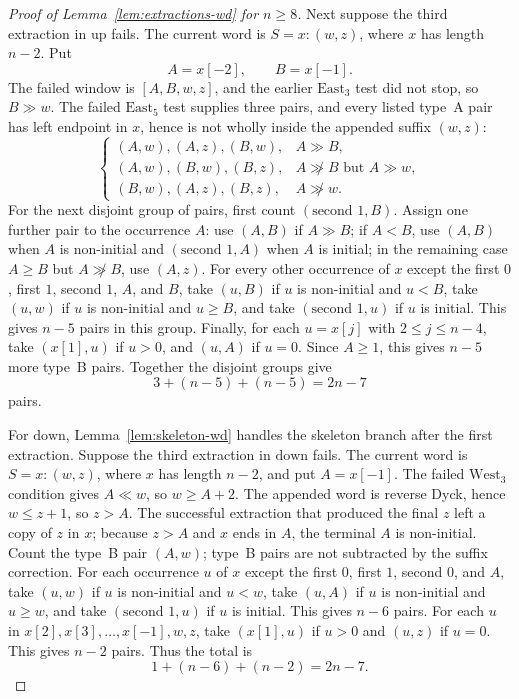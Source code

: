 \documentclass[11pt]{article}
\theoremstyle{plain}
\theoremstyle{definition}
\theoremstyle{remark}
\begin{document}
\begin{proof}[Proof of Lemma~\ref{lem:extractions-wd} for \(n\ge 8\)]
Next suppose the third extraction in \(\mathrm{up}\) fails.  The current word
is \(S=x:(w,z)\), where \(x\) has length \(n-2\).  Put
\[
  A=x[-2],\qquad B=x[-1].
\]
The failed window is \([A,B,w,z]\), and the earlier \(\mathrm{East}_3\) test
did not stop, so \(B\gg w\).  The failed \(\mathrm{East}_5\) test supplies
three pairs, and every listed type~A pair has left endpoint in \(x\), hence is
not wholly inside the appended suffix \((w,z)\):
\[
\begin{cases}
(A,w),(A,z),(B,w),& A\gg B,\\
(A,w),(B,w),(B,z),& A\not\gg B\text{ but }A\gg w,\\
(B,w),(A,z),(B,z),& A\not\gg w.
\end{cases}
\]
For the next disjoint group of pairs, first count
\((\text{second }1,B)\).  Assign one further pair to the occurrence \(A\):
use \((A,B)\) if \(A\gg B\); if \(A<B\), use \((A,B)\) when \(A\) is
non-initial and \((\text{second }1,A)\) when \(A\) is initial; in the remaining
case \(A\ge B\) but \(A\not\gg B\), use \((A,z)\).  For every other occurrence
of \(x\) except the first \(0\), first \(1\), second \(1\), \(A\), and \(B\),
take \((u,B)\) if \(u\) is non-initial and \(u<B\), take \((u,w)\) if \(u\) is
non-initial and \(u\ge B\), and take \((\text{second }1,u)\) if \(u\) is
initial.  This gives \(n-5\) pairs in this group.  Finally, for each \(u=x[j]\)
with \(2\le j\le n-4\), take \((x[1],u)\) if \(u>0\), and \((u,A)\) if
\(u=0\).  Since \(A\ge1\), this gives \(n-5\) more type~B pairs.  Together the
disjoint groups give
\[
  3+(n-5)+(n-5)=2n-7
\]
pairs.

For \(\mathrm{down}\), Lemma~\ref{lem:skeleton-wd} handles the skeleton branch
after the first extraction.  Suppose the third extraction in \(\mathrm{down}\)
fails.  The current word is \(S=x:(w,z)\), where \(x\) has length
\(n-2\), and put \(A=x[-1]\).  The failed \(\mathrm{West}_3\) condition gives
\(A\ll w\), so \(w\ge A+2\).  The appended word is reverse Dyck, hence
\(w\le z+1\), so \(z>A\).  The successful extraction that produced the final
\(z\) left a copy of \(z\) in \(x\); because \(z>A\) and \(x\) ends in \(A\),
the terminal \(A\) is non-initial.  Count the type~B pair \((A,w)\); type~B
pairs are not subtracted by the suffix correction.
For each occurrence \(u\) of \(x\) except the first \(0\), first \(1\), second
\(0\), and \(A\), take \((u,w)\) if \(u\) is non-initial and \(u<w\), take
\((u,A)\) if \(u\) is non-initial and \(u\ge w\), and take
\((\text{second }1,u)\) if \(u\) is initial.  This gives \(n-6\) pairs.  For
each \(u\) in \(x[2],x[3],\ldots,x[-1],w,z\), take \((x[1],u)\) if \(u>0\) and
\((u,z)\) if \(u=0\).  This gives \(n-2\) pairs.  Thus the total is
\[
  1+(n-6)+(n-2)=2n-7.
\]


\end{proof}
\end{document}
